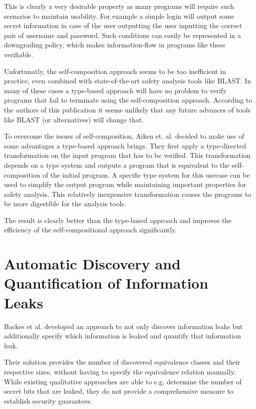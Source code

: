 \documentclass[a4paper,UKenglish]{lipics-v2018}
\begin{document}
This is clearly a very desirable property as many programs will require such scenarios to maintain usability. For example a simple login will output some secret information in case of the user outputting the user inputting the correct pair of username and password. Such conditions can easily be represented in a downgrading policy, which makes information-flow in programs like these verifiable.\cite{secure_information_flow_safety}

Unfortunatly, the self-composition approach seems to be too inefficient in practice, even combined with state-of-the-art safety analysis tools like BLAST. In many of these cases a type-based approach will have no problem to verify programs that fail to terminate using the self-composition approach. According to the authors of this publication it seems unlikely that any future advances of tools like BLAST (or alternatives) will change that.\cite{secure_information_flow_safety}

To overcome the issues of self-composition, Aiken et. al. decided to make use of some advantages a type-based approach brings. They first apply a type-directed transformation on the input program that has to be verified. This transformation depends on a type system and outputs a program that is equivalent to the self-composition of the initial program. A specific type system for this usecase can be used to simplify the output program while maintaining important properties for safety analysis. This relatively inexpensive transformation causes the programs to be more digestible for the analysis tools. 
\cite{secure_information_flow_safety}

The result is clearly better than the type-based approach and improves the efficiency of the self-compositional approach significantly.
\cite{secure_information_flow_safety}



\newpage
\section{Automatic Discovery and Quantification of Information Leaks}

Backes et al. developed an approach to not only discover information leaks but additionally specify which information is leaked and quantify that information leak.\cite{automatic_discovery_and_quantification}

Their solution provides the number of discovered equivalence classes and their respective sizes, without having to specify the equivalence relation manually. While existing qualitative approaches are able to e.g. determine the number of secret bits that are leaked, they do not provide a comprehensive measure to establish security guarantees.\cite{automatic_discovery_and_quantification}
\end{document}
